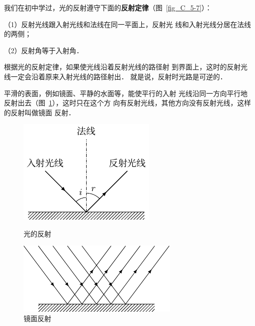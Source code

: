 我们在初中学过，光的反射遵守下面的\textbf{反射定律}（图~\ref{fig_C_5-7}）：


（1）反射光线跟入射光线和法线在同一平面上，反射光
线和入射光线分居在法线的两侧；

（2）反射角等于入射角．


根据光的反射定律，如果使光线沿着反射光线的路径射
到界面上，这时的反射光线一定会沿着原来入射光线的路径射出．
就是说，反射时光路是可逆的．

平滑的表面，例如镜面、平静的水面等，能使平行的入射
光线沿同一方向平行地反射出去（图~\ref{fig_C_5-8}），这时只在这个方
向有反射光线，其他方向没有反射光线，这样的反射叫做镜面
反射．
\begin{figure}[htbp]
    \centering
    \begin{minipage}[t]{0.48\textwidth}
        \centering
        \includegraphics{fig/C/5-7.pdf}
        \caption{光的反射}\label{fig_C_5-7}
    \end{minipage}
    \begin{minipage}[t]{0.48\textwidth}
        \centering
        \includegraphics{fig/C/5-8.pdf}
        \caption{镜面反射}\label{fig_C_5-8}
    \end{minipage}
\end{figure}

